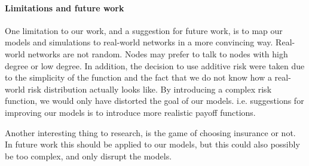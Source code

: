 \paragraph{Limitations and future work}
One limitation to our work, and a suggestion for future work, is to map our models and simulations to real-world networks in a more convincing way. Real-world networks are not random. Nodes may prefer to talk to nodes with high degree or low degree. In addition, the decision to use additive risk were taken due to the simplicity of the function and the fact that we do not know how a real-world risk distribution actually looks like.  By introducing a complex risk function, we would only have distorted the goal of our models. i.e. suggestions for improving our models is to introduce more realistic payoff functions.

Another interesting thing to research, is the game of choosing insurance or not. In future work this should be applied to our models, but this could also possibly be too complex, and only disrupt the models.